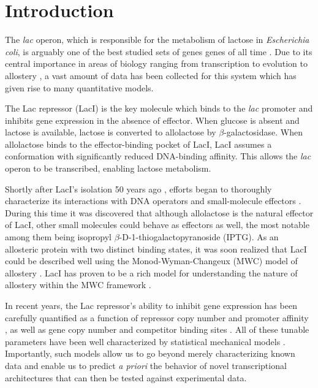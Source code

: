 \section*{Introduction }

The \textit{lac} operon, which is responsible for the metabolism of lactose in
\textit{Escherichia coli}, is arguably one of the best studied sets of genes
genes of all time \cite{MullerHill1996a}. Due to its central importance in areas
of biology ranging from transcription to evolution to allostery
\cite{Oehler1994, Razo-Mejia2014, Daber2008, Lakshmi2009, Swint-Kruse2009,
	Garcia2010, Boedicker2013, Brewster2014, Kuhlman2007}, a vast amount of data has
been collected for this system which has given rise to many quantitative models.

The Lac repressor (LacI) is the key molecule which binds to the \textit{lac}
promoter and inhibits gene expression in the absence of effector. When glucose
is absent and lactose is available, lactose is converted to allolactose by
$\beta$-galactosidase. When allolactose binds to the effector-binding pocket of
LacI, LacI assumes a conformation with significantly reduced DNA-binding
affinity. This allows the \textit{lac} operon to be transcribed, enabling
lactose metabolism.

Shortly after LacI's isolation 50 years ago \cite{Gilbert1966}, efforts began to
thoroughly characterize its interactions with DNA operators and small-molecule
effectors \cite{Riggs1970I, Riggs1970II, Riggs1970III, Jobe1972}. During this
time it was discovered that although allolactose is the natural effector of
LacI, other small molecules could behave as effectors as well, the most notable
among them being isopropyl $\beta$-D-1-thiogalactopyranoside (IPTG). As an
allosteric protein with two distinct binding states, it was soon realized that
LacI could be described well using the Monod-Wyman-Changeux (MWC) model of
allostery \cite{MONOD1965}. LacI has proven to be a rich model for understanding
the nature of allostery within the MWC framework \cite{Daly1986, Dunaway1980,
	Meyer2013, Daber2007, Daber2009, Muller-Hartmann1996, OGorman1980, Sharp2011,
	Taraban2008, Wilson2007}.

In recent years, the Lac repressor's ability to inhibit gene expression has been
carefully quantified as a function of repressor copy number and promoter
affinity \cite{Garcia2011}, as well as gene copy number and competitor binding
sites \cite{Weinert2014}. All of these tunable parameters have been well
characterized by statistical mechanical models \cite{Bintu2005a, Bintu2005b}.
Importantly, such models allow us to go beyond merely characterizing known data
and enable us to predict \textit{a priori} the behavior of novel transcriptional
architectures that can then be tested against experimental data.

